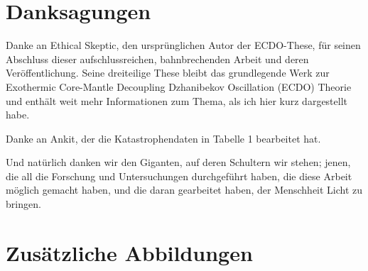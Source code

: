 \documentclass[10pt,twocolumn,letterpaper]{article}
\begin{document}
\section{Danksagungen}

Danke an Ethical Skeptic, den ursprünglichen Autor der ECDO-These, für seinen Abschluss dieser aufschlussreichen, bahnbrechenden Arbeit und deren Veröffentlichung. Seine dreiteilige These \cite{1} bleibt das grundlegende Werk zur Exothermic Core-Mantle Decoupling Dzhanibekov Oscillation (ECDO) Theorie und enthält weit mehr Informationen zum Thema, als ich hier kurz dargestellt habe.

Danke an Ankit, der die Katastrophendaten in Tabelle 1 bearbeitet hat.

Und natürlich danken wir den Giganten, auf deren Schultern wir stehen; jenen, die all die Forschung und Untersuchungen durchgeführt haben, die diese Arbeit möglich gemacht haben, und die daran gearbeitet haben, der Menschheit Licht zu bringen.

\clearpage
\twocolumn

\section{Zusätzliche Abbildungen}
\end{document}
